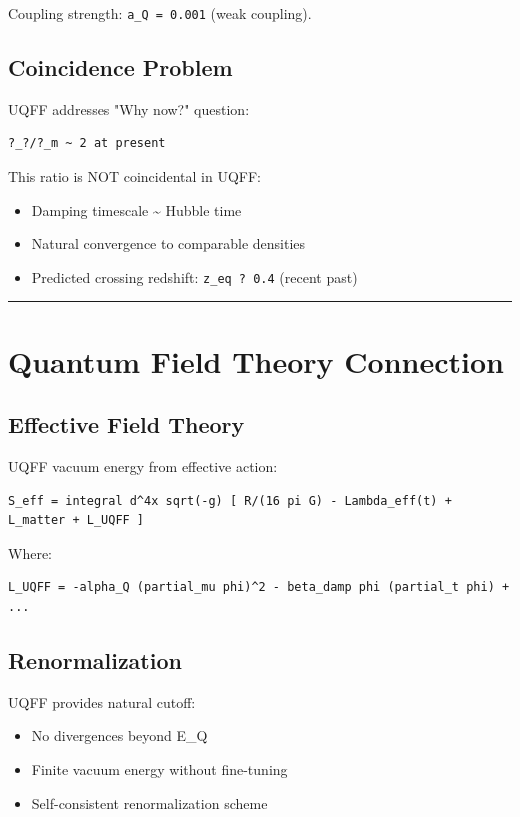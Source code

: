 \documentclass[12pt,a4paper]{article}
\begin{document}
Coupling strength: \texttt{a\_Q = 0.001} (weak coupling).

\subsection{Coincidence Problem}

UQFF addresses "Why now?" question:

\begin{verbatim}
?_?/?_m ~ 2 at present
\end{verbatim}

This ratio is NOT coincidental in UQFF:

\begin{itemize}
  \item Damping timescale \textasciitilde{} Hubble time
  \item Natural convergence to comparable densities
  \item Predicted crossing redshift: \texttt{z\_eq ? 0.4} (recent past)
\end{itemize}

\medskip\hrule\medskip

\section{Quantum Field Theory Connection}

\subsection{Effective Field Theory}

UQFF vacuum energy from effective action:

\begin{verbatim}
S_eff = integral d^4x sqrt(-g) [ R/(16 pi G) - Lambda_eff(t) + L_matter + L_UQFF ]
\end{verbatim}

Where:

\begin{verbatim}
L_UQFF = -alpha_Q (partial_mu phi)^2 - beta_damp phi (partial_t phi) + ...
\end{verbatim}

\subsection{Renormalization}

UQFF provides natural cutoff:

\begin{itemize}
  \item No divergences beyond E\_Q
  \item Finite vacuum energy without fine-tuning
  \item Self-consistent renormalization scheme
\end{itemize}
\end{document}
